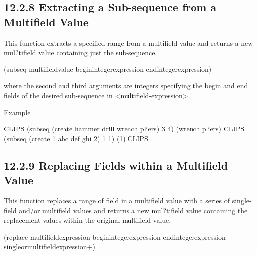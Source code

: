 \documentclass[letterpaper,10pt,english]{sphinxmanual}
\begin{document}
\subsection{12.2.8 Extracting a Sub-sequence from a Multifield Value}
\label{\detokenize{actions:extracting-a-sub-sequence-from-a-multifield-value}}
This function extracts a specified range from a multifield value and
returns a new mul?tifield value containing just the sub-sequence.


\begin{sphinxVerbatim}[commandchars=\\\{\}]
(subseq\PYGZdl{} \PYGZlt{}multifield\PYGZhy{}value\PYGZgt{}
  \PYGZlt{}begin\PYGZhy{}integer\PYGZhy{}expression\PYGZgt{}
  \PYGZlt{}end\PYGZhy{}integer\PYGZhy{}expression\PYGZgt{})
\end{sphinxVerbatim}

where the second and third arguments are integers specifying the begin
and end fields of the desired sub-sequence in \textless{}multifield-expression\textgreater{}.

Example

\begin{sphinxVerbatim}[commandchars=\\\{\}]
CLIPS\PYGZgt{} (subseq\PYGZdl{} (create\PYGZdl{} hammer drill wrench pliers) 3 4)
(wrench pliers)
CLIPS\PYGZgt{} (subseq\PYGZdl{} (create\PYGZdl{} 1 \PYGZdq{}abc\PYGZdq{} def \PYGZdq{}ghi\PYGZdq{} 2) 1 1)
(1)
CLIPS\PYGZgt{}
\end{sphinxVerbatim}


\subsection{12.2.9 Replacing Fields within a Multifield Value}
\label{\detokenize{actions:replacing-fields-within-a-multifield-value}}
This function replaces a range of field in a multifield value with a
series of single-field and/or multifield values and returns a new
mul?tifield value containing the replacement values within the original
multifield value.


\begin{sphinxVerbatim}[commandchars=\\\{\}]
  (replace\PYGZdl{} \PYGZlt{}multifield\PYGZhy{}expression\PYGZgt{}
\PYGZlt{}begin\PYGZhy{}integer\PYGZhy{}expression\PYGZgt{}
    \PYGZlt{}end\PYGZhy{}integer\PYGZhy{}expression\PYGZgt{}
    \PYGZlt{}single\PYGZhy{}or\PYGZhy{}multi\PYGZhy{}field\PYGZhy{}expression\PYGZgt{}+)
\end{sphinxVerbatim}
\end{document}
